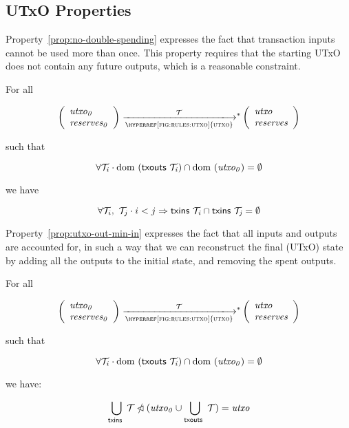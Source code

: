 \subsection{UTxO Properties}
\label{sec:utxo-properties}

Property~\ref{prop:no-double-spending} expresses the fact that transaction
inputs cannot be used more than once. This property requires that the starting
UTxO does not contain any future outputs, which is a reasonable constraint.

\begin{property}\label{prop:no-double-spending}
  For all

  $$
  \left(
    \begin{array}{l}
      \var{utxo_0}\\
      \var{reserves_0}
    \end{array}
  \right)
  \transtar{\hyperref[fig:rules:utxo]{utxo}}{\txs}
  \left(
    \begin{array}{l}
      \var{utxo}\\
      \var{reserves}
    \end{array}
  \right)
  $$

  such that

  $$
    \forall \mathcal{T}_i \cdot \operatorname{dom}~(\mathsf{txouts}~ \mathit{\mathcal{T}_i}) \cap \operatorname{dom}~(\mathit{utxo_0}) = \emptyset
  $$

  we have

  $$
  \forall \mathcal{T}_i,~\mathcal{T}_j \cdot i < j \Rightarrow \mathsf{txins}~ \mathit{\mathcal{T}_i} \cap \mathsf{txins}~ \mathit{\mathcal{T}_j} = \emptyset
  $$
\end{property}

Property~\ref{prop:utxo-out-min-in} expresses the fact that all inputs and
outputs are accounted for, in such a way that we can reconstruct the final
(UTxO) state by adding all the outputs to the initial state, and removing the
spent outputs.

\begin{property}\label{prop:utxo-out-min-in}
  For all

  $$
  \left(
    \begin{array}{l}
      \var{utxo_0}\\
      \var{reserves_0}
    \end{array}
  \right)
  \transtar{\hyperref[fig:rules:utxo]{utxo}}{\txs}
  \left(
    \begin{array}{l}
      \var{utxo}\\
      \var{reserves}
    \end{array}
  \right)
  $$

  such that

  $$
    \forall \mathcal{T}_i \cdot \operatorname{dom}~(\mathsf{txouts}~ \mathit{\mathcal{T}_i}) \cap \operatorname{dom}~(\mathit{utxo_0}) = \emptyset
  $$

  we have:

  $$
  \bigcup_{\mathsf{txins}~ \mathit{}} \mathcal{T} \mathbin{\slashed{\lhd}} (\mathit{utxo_0} \cup \bigcup_{\mathsf{txouts}~ \mathit{}} \mathcal{T}) = \mathit{utxo}
  $$

\end{property}

